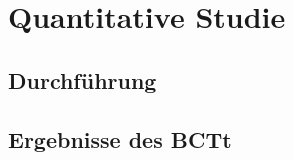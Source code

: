 \chapter[Quantitative Studie]{Quantitative Studie}
\section{Durchführung}
\section{Ergebnisse des BCTt}
